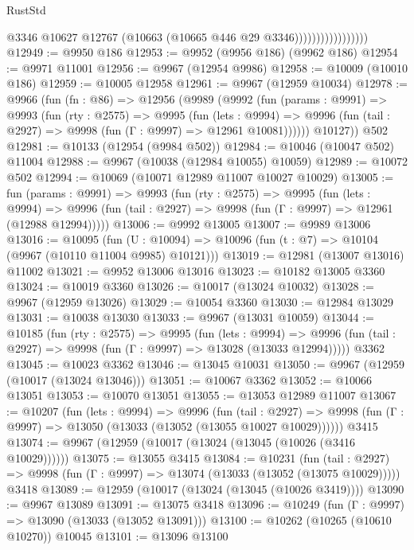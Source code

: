 \begin{lexlean}{RustStd}
\begin{coremodule}
{\begin{coremodule}
{{{{{{{{{{{{{{{{{{{{{{{{{{{{{{{{{{{{{{{{{{{{{{{{{{{{{{{{{{{{{{{{{{{{{{{{{{{{{{                                  @3346
                                  @10627
                                  @12767
                                  (@10663 (@10665 @446 @29 @3346)))))))))))))))))
@12949 := @9950 @186
@12953 := @9952 (@9956 @186) (@9962 @186)
@12954 := @9971 @11001
@12956 := @9967 (@12954 @9986)
@12958 := @10009 (@10010 @186)
@12959 := @10005 @12958
@12961 := @9967 (@12959 @10034)
@12978 := @9966
    (fun (fn : @86) =>
    @12956
      (@9989
        (@9992
          (fun (params : @9991) =>
          @9993
            (fun (rty : @2575) =>
            @9995
              (fun (lets : @9994) =>
              @9996 (fun (tail : @2927) => @9998 (fun (Γ : @9997) => @12961 @10081))))))
        @10127))
    @502
@12981 := @10133 (@12954 (@9984 @502))
@12984 := @10046 (@10047 @502) @11004
@12988 := @9967 (@10038 (@12984 @10055) @10059)
@12989 := @10072 @502
@12994 := @10069 (@10071 @12989 @11007 @10027 @10029)
@13005 := fun (params : @9991) =>
  @9993
    (fun (rty : @2575) =>
    @9995
      (fun (lets : @9994) =>
      @9996 (fun (tail : @2927) => @9998 (fun (Γ : @9997) => @12961 (@12988 @12994)))))
@13006 := @9992 @13005
@13007 := @9989 @13006
@13016 := @10095
    (fun (U : @10094) => @10096 (fun (t : @7) => @10104 (@9967 (@10110 @11004 @9985) @10121)))
@13019 := @12981 (@13007 @13016) @11002
@13021 := @9952 @13006 @13016
@13023 := @10182 @13005 @3360
@13024 := @10019 @3360
@13026 := @10017 (@13024 @10032)
@13028 := @9967 (@12959 @13026)
@13029 := @10054 @3360
@13030 := @12984 @13029
@13031 := @10038 @13030
@13033 := @9967 (@13031 @10059)
@13044 := @10185
    (fun (rty : @2575) =>
    @9995
      (fun (lets : @9994) =>
      @9996 (fun (tail : @2927) => @9998 (fun (Γ : @9997) => @13028 (@13033 @12994)))))
    @3362
@13045 := @10023 @3362
@13046 := @13045 @10031
@13050 := @9967 (@12959 (@10017 (@13024 @13046)))
@13051 := @10067 @3362
@13052 := @10066 @13051
@13053 := @10070 @13051
@13055 := @13053 @12989 @11007
@13067 := @10207
    (fun (lets : @9994) =>
    @9996
      (fun (tail : @2927) =>
      @9998 (fun (Γ : @9997) => @13050 (@13033 (@13052 (@13055 @10027 @10029))))))
    @3415
@13074 := @9967 (@12959 (@10017 (@13024 (@13045 (@10026 (@3416 @10029))))))
@13075 := @13055 @3415
@13084 := @10231
    (fun (tail : @2927) => @9998 (fun (Γ : @9997) => @13074 (@13033 (@13052 (@13075 @10029)))))
    @3418
@13089 := @12959 (@10017 (@13024 (@13045 (@10026 @3419))))
@13090 := @9967 @13089
@13091 := @13075 @3418
@13096 := @10249 (fun (Γ : @9997) => @13090 (@13033 (@13052 @13091)))
@13100 := @10262 (@10265 (@10610 @10270)) @10045
@13101 := @13096 @13100
}}}}}}}}}}}}}}}}}}}}}}}}}}}}}}}}}}}}}}}}}}}}}}}}}}}}}}}}}}}}}}}}}}}}}}}}}}}}}}
\end{coremodule}}
\end{coremodule}
\end{lexlean}
